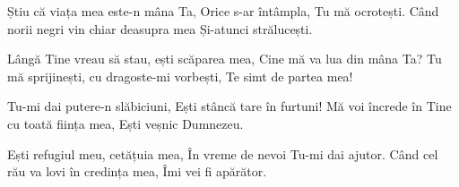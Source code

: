 \beginverse
Știu că viața mea este-n mâna Ta,
Orice s-ar întâmpla, Tu mă ocrotești.
Când norii negri vin chiar deasupra mea
Și-atunci strălucești.
\endverse

\beginverse*
Lângă Tine vreau să stau, ești scăparea mea,
Cine mă va lua din mâna Ta?
Tu mă sprijinești, cu dragoste-mi vorbești,
Te simt de partea mea!
\endverse

\beginchorus
Tu-mi dai putere-n slăbiciuni,
Ești stâncă tare în furtuni!
Mă voi încrede în Tine cu toată ființa mea,
Ești veșnic Dumnezeu.
\endchorus

\beginverse
Ești refugiul meu, cetățuia mea,
În vreme de nevoi Tu-mi dai ajutor.
Când cel rău va lovi în credința mea,
Îmi vei fi apărător.
\endverse
\endsong